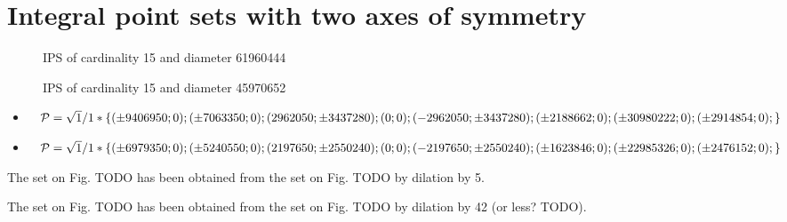 \documentclass[12pt]{article}
\theoremstyle{theorem}
\theoremstyle{dfn}
\theoremstyle{remark}
\begin{document}
\section{Integral point sets with two axes of symmetry}

\begin{figure}[h!]
\parbox{1\linewidth}{\caption{IPS of cardinality 15 and diameter 61960444}
\label{15_61960444_1.png}}
\end{figure}

\begin{figure}[h!]
\parbox{1\linewidth}{\caption{IPS of cardinality 15 and diameter 45970652}
\label{15_45970652_1.png}}
\end{figure}

\begin{itemize}
\item
$\mathcal{P}=\sqrt{1}/1*\{
( \pm9406950 ; 0);
( \pm7063350 ; 0);
( 2962050 ; \pm3437280);
( 0 ; 0);
( -2962050 ; \pm3437280);\\
( \pm2188662 ; 0);
( \pm30980222 ; 0);
( \pm2914854 ; 0);
\}$

\item
$\mathcal{P}=\sqrt{1}/1*\{
( \pm6979350 ; 0);
( \pm5240550 ; 0);
( 2197650 ; \pm2550240);
( 0 ; 0);
( -2197650 ; \pm2550240);\\
( \pm1623846 ; 0);
( \pm22985326 ; 0);
( \pm2476152 ; 0);
\}$
\end{itemize}



The set on Fig. TODO has been obtained from the set on Fig. TODO by dilation by 5.

The set on Fig. TODO has been obtained from the set on Fig. TODO by dilation by 42 (or less? TODO).
\end{document}
